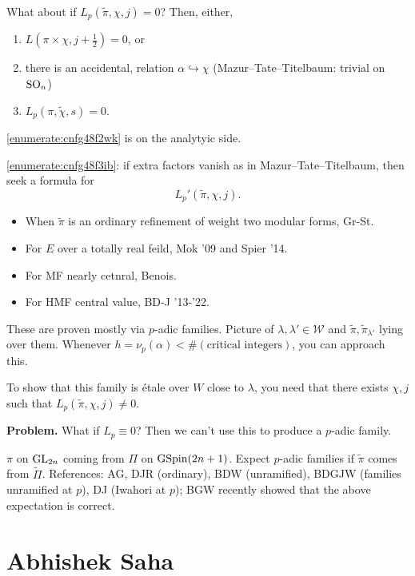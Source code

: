 \documentclass[reqno]{amsart} 
\begin{document}
What about if $L_p(\tilde{\pi}, \chi, j) = 0$?  Then, either,
\begin{enumerate}
\item\label{enumerate:cnfg48f2wk} $L(\pi \times \chi, j + \tfrac{1}{2}) = 0$, or
\item\label{enumerate:cnfg48f3ib} there is an accidental, relation $\alpha \hookrightarrow \chi$ (Mazur--Tate--Titelbaum: trivial on $\operatorname{SO}_n$)
\item\label{enumerate:cnfg48f4du} $L_p(\tilde{\pi, \chi, s})= 0$.
\end{enumerate}

\eqref{enumerate:cnfg48f2wk} is on the analytyic side.

\eqref{enumerate:cnfg48f3ib}: if extra factors vanish as in Mazur--Tate--Titelbaum, then seek a formula for
\begin{equation*}
  L_p '(\tilde{\pi}, \chi, j).
\end{equation*}
\begin{itemize}
\item When $\tilde{\pi}$ is an ordinary refinement of weight two modular forms, Gr-St.
\item For $E$ over a totally real feild, Mok '09 and Spier '14.
\item For MF nearly cetnral, Benois.
\item For HMF central value, BD-J '13-'22.
\end{itemize}
These are proven mostly via $p$-adic families.  Picture of $\lambda , \lambda ' \in \mathcal{W}$ and $\tilde{\pi}, \tilde{\pi}_{\lambda '}$ lying over them.  Whenever $h = \nu_p(\alpha) < \#(\text{critical integers})$, you can approach this.

To show that this family is {\'e}tale over $W$ close to $\lambda$, you need that there exists $\chi, j$ such that $L_p(\tilde{\pi}, \chi, j) \neq 0$.

\textbf{Problem.}  What if $L_p \equiv 0$?  Then we can't use this to produce a $p$-adic family.

$\pi$ on $\operatorname{GL}_{2n}$ coming from $\Pi$ on $\operatorname{GSpin}(2 n + 1)$.  Expect $p$-adic families if $\tilde{\pi}$ comes from $\tilde{\Pi}$.  References: AG, DJR (ordinary), BDW (unramified), BDGJW (families unramified at $p$), DJ (Iwahori at $p$); BGW recently showed that the above expectation is correct.

\section{Abhishek Saha}




{} 
\end{document}

